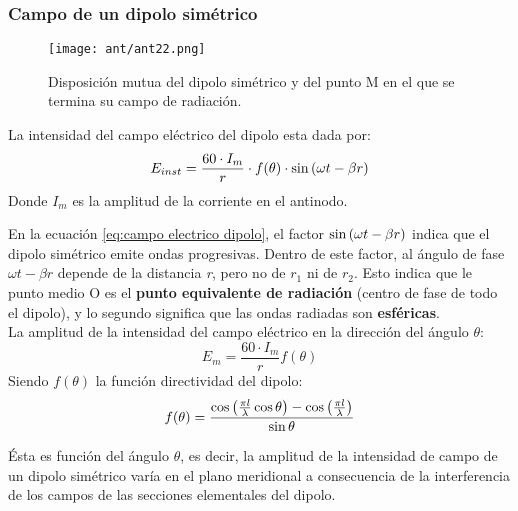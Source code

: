 \documentclass[
	12pt, %
	fleqn, %
	a4paper, %
	oneside, %
]{LegrandOrangeBook}
\begin{document}
\subsubsection{Campo de un dipolo simétrico}
\begin{figure}[H]
\centering
\texttt{[image: ant/ant22.png]}
\caption{Disposición mutua del dipolo simétrico y del punto M en el que se termina su campo de radiación.}
\end{figure}
\begin{definition}
La intensidad del campo eléctrico del dipolo esta dada por:
\begin{equation}
E_{inst}=\frac{60\cdot I_m}{r}\cdot f(\theta)\cdot\sin\left(\omega t-\beta r\right)
\label{eq:campo electrico dipolo}
\end{equation}
Donde $I_m$ es la amplitud de la corriente en el antinodo.
\end{definition}
En la ecuación \ref{eq:campo electrico dipolo}, el factor $\sin\left(\omega t-\beta r\right)$ indica que el dipolo simétrico emite ondas progresivas. Dentro de este factor, al ángulo de fase $\omega t-\beta r$ depende de la distancia \textit{r}, pero no de $r_1$ ni de $r_2$. Esto indica que le punto medio O es el \textbf{punto equivalente de radiación} (centro de fase de todo el dipolo), y lo segundo significa que las ondas radiadas son \textbf{esféricas}.\\
La amplitud de la intensidad del campo eléctrico en la dirección del ángulo $\theta$:
\begin{equation}
E_m=\frac{60\cdot I_m}{r}f(\theta)
\end{equation}
Siendo $f(\theta)$ la función directividad del dipolo:
\begin{equation}
f(\theta)=\frac{\cos\left(\frac{\pi l}{\lambda}\cos\theta\right)-\cos\left(\frac{\pi l}{\lambda}\right)}{\sin\theta}
\end{equation}
\begin{corollary}
Ésta es función del ángulo $\theta$, es decir, la amplitud de la intensidad de campo de un dipolo simétrico varía en el plano meridional a consecuencia de la interferencia de los campos de las secciones elementales del dipolo.
\end{corollary}
\end{document}
